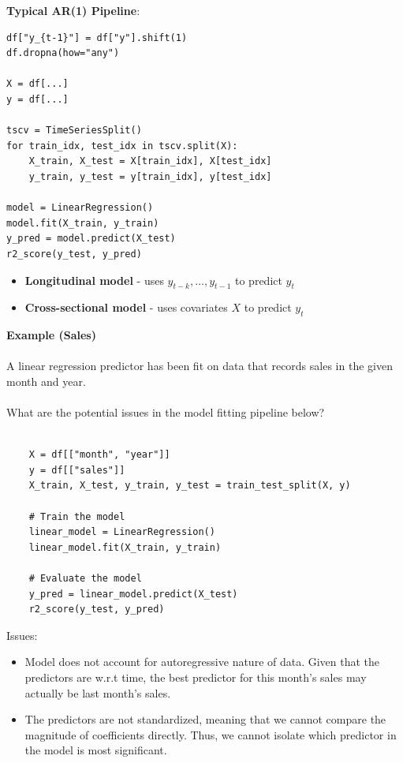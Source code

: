 \documentclass{article}
\begin{document}
\textbf{Typical AR(1) Pipeline}:
\begin{verbatim}
df["y_{t-1}"] = df["y"].shift(1)
df.dropna(how="any")

X = df[...]
y = df[...]

tscv = TimeSeriesSplit()
for train_idx, test_idx in tscv.split(X):
    X_train, X_test = X[train_idx], X[test_idx]
    y_train, y_test = y[train_idx], y[test_idx]

model = LinearRegression()
model.fit(X_train, y_train)
y_pred = model.predict(X_test)
r2_score(y_test, y_pred)
\end{verbatim}

\begin{itemize}
    \item \textbf{Longitudinal model} - uses $y_{t-k}, \ldots, y_{t-1}$ to predict $y_t$
    \item \textbf{Cross-sectional model} - uses covariates $X$ to predict $y_t$
\end{itemize}

\noindent\textbf{Example (Sales)} \\
\\
A linear regression predictor has been fit on data that records sales in the given month and year. \\
\\
What are the potential issues in the model fitting pipeline below? \\
\\
\begin{verbatim}
    X = df[["month", "year"]]
    y = df[["sales"]]
    X_train, X_test, y_train, y_test = train_test_split(X, y)

    # Train the model
    linear_model = LinearRegression()
    linear_model.fit(X_train, y_train)

    # Evaluate the model
    y_pred = linear_model.predict(X_test)
    r2_score(y_test, y_pred)
\end{verbatim}

Issues:
\begin{itemize}
    \item Model does not account for autoregressive nature of data. Given that the predictors are w.r.t time,
    the best predictor for this month's sales may actually be last month's sales.
    \item The predictors are not standardized, meaning that we cannot compare the magnitude of coefficients directly. Thus,
    we cannot isolate which predictor in the model is most significant.
\end{itemize}
\end{document}
